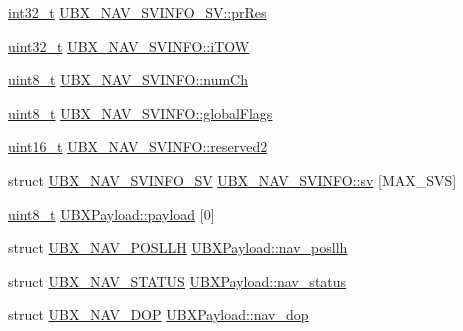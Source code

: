 \begin{DoxyCompactItemize}
\item 
\hyperlink{group___n_a_m_e_gafd12020da5a235dfcf0c3c748fb5baed}{int32\-\_\-t} \hyperlink{group___g_s_p_module_gadf2342e560319acf1b48051a49463b09}{U\-B\-X\-\_\-\-N\-A\-V\-\_\-\-S\-V\-I\-N\-F\-O\-\_\-\-S\-V\-::pr\-Res}
\item 
\hyperlink{stdint_8h_a435d1572bf3f880d55459d9805097f62}{uint32\-\_\-t} \hyperlink{group___g_s_p_module_gaf3c4fbdc3e4b6fe40fae556f1de555bb}{U\-B\-X\-\_\-\-N\-A\-V\-\_\-\-S\-V\-I\-N\-F\-O\-::i\-T\-O\-W}
\item 
\hyperlink{stdint_8h_aba7bc1797add20fe3efdf37ced1182c5}{uint8\-\_\-t} \hyperlink{group___g_s_p_module_ga0c11d355a8dcd6cf6687ce19ae052a52}{U\-B\-X\-\_\-\-N\-A\-V\-\_\-\-S\-V\-I\-N\-F\-O\-::num\-Ch}
\item 
\hyperlink{stdint_8h_aba7bc1797add20fe3efdf37ced1182c5}{uint8\-\_\-t} \hyperlink{group___g_s_p_module_ga9ea30e93a506e7749f8121ff4e811aae}{U\-B\-X\-\_\-\-N\-A\-V\-\_\-\-S\-V\-I\-N\-F\-O\-::global\-Flags}
\item 
\hyperlink{stdint_8h_a273cf69d639a59973b6019625df33e30}{uint16\-\_\-t} \hyperlink{group___g_s_p_module_ga2c5c4d3b1882220da507ddacbe43159b}{U\-B\-X\-\_\-\-N\-A\-V\-\_\-\-S\-V\-I\-N\-F\-O\-::reserved2}
\item 
struct \hyperlink{struct_u_b_x___n_a_v___s_v_i_n_f_o___s_v}{U\-B\-X\-\_\-\-N\-A\-V\-\_\-\-S\-V\-I\-N\-F\-O\-\_\-\-S\-V} \hyperlink{group___g_s_p_module_gae22f11e4be4f99b2627ff494e335a313}{U\-B\-X\-\_\-\-N\-A\-V\-\_\-\-S\-V\-I\-N\-F\-O\-::sv} \mbox{[}M\-A\-X\-\_\-\-S\-V\-S\mbox{]}
\item 
\hyperlink{stdint_8h_aba7bc1797add20fe3efdf37ced1182c5}{uint8\-\_\-t} \hyperlink{group___g_s_p_module_ga1aaa9f05bb8d9cec08462c71aedeb224}{U\-B\-X\-Payload\-::payload} \mbox{[}0\mbox{]}
\item 
struct \hyperlink{struct_u_b_x___n_a_v___p_o_s_l_l_h}{U\-B\-X\-\_\-\-N\-A\-V\-\_\-\-P\-O\-S\-L\-L\-H} \hyperlink{group___g_s_p_module_gac43eeda1b5ade727f5856e57ae8d4fdb}{U\-B\-X\-Payload\-::nav\-\_\-posllh}
\item 
struct \hyperlink{struct_u_b_x___n_a_v___s_t_a_t_u_s}{U\-B\-X\-\_\-\-N\-A\-V\-\_\-\-S\-T\-A\-T\-U\-S} \hyperlink{group___g_s_p_module_ga10f246cbf1341ebaca17da26a61eb344}{U\-B\-X\-Payload\-::nav\-\_\-status}
\item 
struct \hyperlink{struct_u_b_x___n_a_v___d_o_p}{U\-B\-X\-\_\-\-N\-A\-V\-\_\-\-D\-O\-P} \hyperlink{group___g_s_p_module_gaabf42aafbe0f26fe6224cd255ddfcbd3}{U\-B\-X\-Payload\-::nav\-\_\-dop}
\item 

\end{DoxyCompactItemize}
